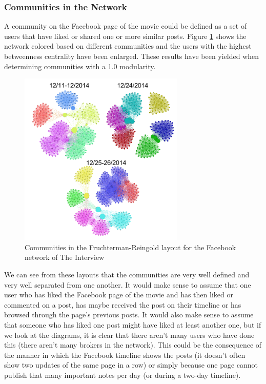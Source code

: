 \documentclass{llncs}
\begin{document}
\subsubsection{Communities in the Network}
A community on the Facebook page of the movie could be defined as a set of users
that have liked or shared one or more similar posts. Figure
\ref{fig:interview-facebook-communities} shows the
network colored based on different communities and the users with the highest
betweenness centrality have been enlarged. These results have been yielded when
determining communities with a 1.0 modularity.
%
\begin{figure}
\centering
\includegraphics[width=0.7\textwidth]{interview-facebook-communities.png}
\caption{Communities in the Fruchterman-Reingold layout for the Facebook network
    of The Interview
\label{fig:interview-facebook-communities}}
\end{figure}
%
We can see from these layouts that the communities are very well defined and
very well separated from one another. It would make sense to assume that one
user who has liked the Facebook page of the movie and has then liked or
commented on a post, has maybe received the post on their timeline or has
browsed through the page's previous posts. It would also make sense to assume
that someone who has liked one post might have liked at least another one, but
if we look at the diagrams, it is clear that there aren't many users who have
done this (there aren't many brokers in the network). This could be the
consequence of the manner in which the Facebook timeline shows the posts (it
doesn't often show two updates of the same page in a row) or simply because one
page cannot publish that many important notes per day (or during a two-day
timeline).
%
\end{document}
